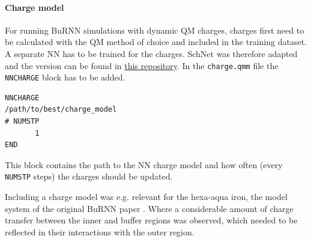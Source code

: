 \paragraph{Charge model}
For running BuRNN simulations with dynamic QM charges, charges first need to be calculated with the QM method of choice and included in the training dataset. A separate NN has to be trained for the charges. SchNet was therefore adapted and the version can be found in \href{https://github.com/juliawestermayr/schnetpack}{this repository}.
In the \texttt{charge.qmm} file the \texttt{NNCHARGE} block has to be added. 

\begin{lstlisting}[breaklines=true, breakatwhitespace=false]
NNCHARGE
/path/to/best/charge_model
# NUMSTP
       1
END
\end{lstlisting}

This block contains the path to the NN charge model and how often (every \texttt{NUMSTP} steps) the charges should be updated.

Including a charge model was e.g. relevant for the hexa-aqua iron, the model system of the original BuRNN paper \cite{Lier2022BuRNN}. Where a considerable amount of charge transfer between the inner and buffer regions was observed, which needed to be reflected in their interactions with the outer region.

